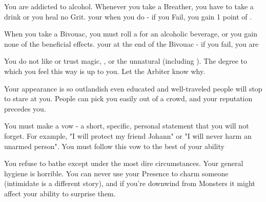 {    


    You are addicted to alcohol.  Whenever you take a Breather, you have to take a drink or you heal no Grit.  \RS your \VIG when you do - if you Fail, you gain 1 point of . 

    When you take a Bivouac, you must roll a \UD for an alcoholic beverage, or you gain none of the beneficial effects. \RS your \VIG at the end of the Bivouac - if you fail, you are 



    You do not like or trust magic, , or the unnatural (including ).  The degree to which you feel this way is up to you.  Let the Arbiter know why.


    Your appearance is so outlandish even educated and well-traveled people will stop to stare at you. People can pick you easily out of a crowd, and your reputation precedes you.

  
    You must make a vow - a short, specific, personal statement that you will not forget. For example, "I will protect my friend Johann" or "I will never harm an unarmed person".  You must follow this vow to the best of your ability


    You refuse to bathe except under the most dire circumstances.  Your general hygiene is horrible.  You can never use your Presence to charm someone (intimidate is a different story), and if you're downwind from Monsters it might affect your ability to surprise them.

}
